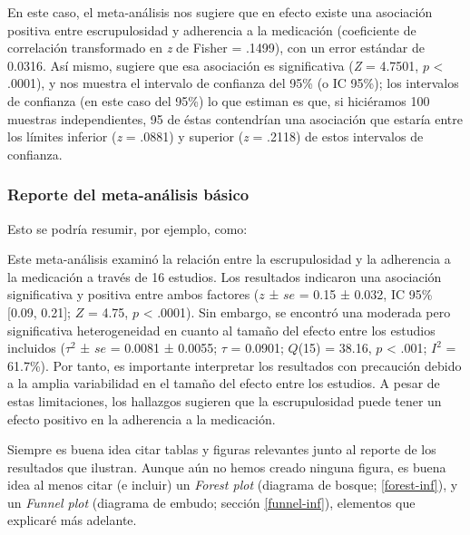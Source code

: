 \documentclass[
  bookmarksnumbered]{article}
\begin{document}
En este caso, el meta-análisis nos sugiere que en efecto existe una asociación positiva entre escrupulosidad y adherencia a la medicación (coeficiente de correlación transformado en \emph{z} de Fisher = .1499), con un error estándar de 0.0316. Así mismo, sugiere que esa asociación es significativa (\emph{Z} = 4.7501, \(p\) \textless{} .0001), y nos muestra el intervalo de confianza del 95\% (o IC 95\%); los intervalos de confianza (en este caso del 95\%) lo que estiman es que, si hiciéramos 100 muestras independientes, 95 de éstas contendrían una asociación que estaría entre los límites inferior (\emph{z} = .0881) y superior (\emph{z} = .2118) de estos intervalos de confianza.

\hypertarget{reporte1}{%
\subsubsection{Reporte del meta-análisis básico}\label{reporte1}}

Esto se podría resumir, por ejemplo, como:

\begin{tcolorbox}[enhanced,attach boxed title to top center={yshift=-3mm,yshifttext=-1mm},
  colback=iacol!5!white,colframe=iacol!75!white,colbacktitle=iacol,
  title=Ejemplo de reporte básico,fonttitle=\bfseries,
  boxed title style={size=small,colframe=iacol} ]
  
Este meta-análisis examinó la relación entre la escrupulosidad y la adherencia a la medicación a través de 16 estudios. Los resultados indicaron una asociación significativa y positiva entre ambos factores ($z$ ± $se$ = 0.15 ± 0.032, IC 95\% [0.09, 0.21]; $Z$ = 4.75, $p$ < .0001). Sin embargo, se encontró una moderada pero significativa heterogeneidad en cuanto al tamaño del efecto entre los estudios incluidos ($\tau^2$ ± $se$ =  0.0081 ± 0.0055; $\tau$ = 0.0901; $Q$(15) =  38.16, $p$ < .001; $I^2$ = 61.7\%). Por tanto, es importante interpretar los resultados con precaución debido a la amplia variabilidad en el tamaño del efecto entre los estudios. A pesar de estas limitaciones, los hallazgos sugieren que la escrupulosidad puede tener un efecto positivo en la adherencia a la medicación.

\end{tcolorbox}

Siempre es buena idea citar tablas y figuras relevantes junto al reporte de los resultados que ilustran. Aunque aún no hemos creado ninguna figura, es buena idea al menos citar (e incluir) un \emph{Forest plot} (diagrama de bosque; \ref{forest-inf}), y un \emph{Funnel plot} (diagrama de embudo; sección \ref{funnel-inf}), elementos que explicaré más adelante.
\end{document}
